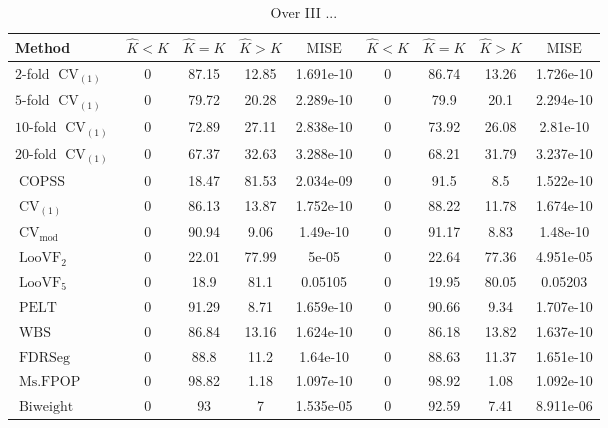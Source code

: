 \begin{table}[ht]
\centering
\begin{tabular}{|l|cccc|cccc|}
  \hline
Method & $\hat{K} < K$ & $\hat{K} = K$ & $\hat{K} > K$ & $\operatorname{MISE}$ & $\hat{K} < K$ & $\hat{K} = K$ & $\hat{K} > K$ & $\operatorname{MISE}$ \\ 
  \hline
$2$-fold $\operatorname{CV}_{(1)}$ &     0 & 87.15 & 12.85 & 1.691e-10 &     0 & 86.74 & 13.26 & 1.726e-10 \\ 
  $5$-fold $\operatorname{CV}_{(1)}$ &     0 & 79.72 & 20.28 & 2.289e-10 &     0 &  79.9 &  20.1 & 2.294e-10 \\ 
  $10$-fold $\operatorname{CV}_{(1)}$ &     0 & 72.89 & 27.11 & 2.838e-10 &     0 & 73.92 & 26.08 & 2.81e-10 \\ 
  $20$-fold $\operatorname{CV}_{(1)}$ &     0 & 67.37 & 32.63 & 3.288e-10 &     0 & 68.21 & 31.79 & 3.237e-10 \\ 
  $\operatorname{COPSS}$ &     0 & 18.47 & 81.53 & 2.034e-09 &     0 &  91.5 &   8.5 & 1.522e-10 \\ 
  $\operatorname{CV}_{(1)}$ &     0 & 86.13 & 13.87 & 1.752e-10 &     0 & 88.22 & 11.78 & 1.674e-10 \\ 
  $\operatorname{CV}_{\operatorname{mod}}$ &     0 & 90.94 &  9.06 & 1.49e-10 &     0 & 91.17 &  8.83 & 1.48e-10 \\ 
  $\operatorname{LooVF}_2$ &     0 & 22.01 & 77.99 & 5e-05 &     0 & 22.64 & 77.36 & 4.951e-05 \\ 
  $\operatorname{LooVF}_5$ &     0 &  18.9 &  81.1 & 0.05105 &     0 & 19.95 & 80.05 & 0.05203 \\ 
  $\operatorname{PELT}$ &     0 & 91.29 &  8.71 & 1.659e-10 &     0 & 90.66 &  9.34 & 1.707e-10 \\ 
  $\operatorname{WBS}$ &     0 & 86.84 & 13.16 & 1.624e-10 &     0 & 86.18 & 13.82 & 1.637e-10 \\ 
  $\operatorname{FDRSeg}$ &     0 &  88.8 &  11.2 & 1.64e-10 &     0 & 88.63 & 11.37 & 1.651e-10 \\ 
  $\operatorname{Ms.FPOP}$ &     0 & 98.82 &  1.18 & 1.097e-10 &     0 & 98.92 &  1.08 & 1.092e-10 \\ 
  $\operatorname{Biweight}$ &     0 &    93 &     7 & 1.535e-05 &     0 & 92.59 &  7.41 & 8.911e-06 \\ 
   \hline
\end{tabular}
\caption{Over III ...} 
\end{table}
